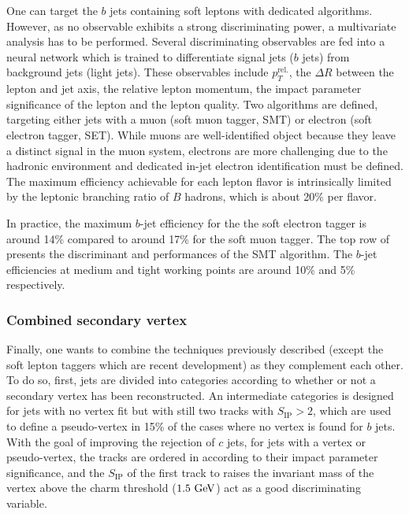    One can target the $b$ jets containing soft leptons with dedicated algorithms. However,
    as no observable exhibits a strong discriminating power, a multivariate analysis
    has to be performed. Several discriminating observables are fed into a neural network
    which is trained to differentiate signal jets ($b$ jets) from background jets (light jets).
    These observables include $p_T^\text{rel.}$, the $\Delta R$ between the lepton and
    jet axis, the relative lepton momentum, the impact parameter significance of the lepton
    and the lepton quality. Two algorithms are defined, targeting either jets with a
    muon (soft muon tagger, SMT) or electron (soft electron tagger, SET). While muons are
    well-identified object because they leave a distinct signal in the muon system,
    electrons are more challenging due to the hadronic environment and dedicated in-jet
    electron identification must be defined. The maximum efficiency achievable for each
    lepton flavor is intrinsically limited by the leptonic branching ratio of $B$ hadrons,
    which is about 20\% per flavor.

    In practice, the maximum $b$-jet efficiency for the the soft electron tagger is around
    14\% compared to around 17\% for the soft muon tagger. The top row of
     presents the discriminant and performances of the
    SMT algorithm. The $b$-jet efficiencies at medium and tight working points are around
    10\% and 5\% respectively.

        \subsubsection{Combined secondary vertex}

    Finally, one wants to combine the techniques previously described (except the
    soft lepton taggers which are recent development) as they complement each other. To
    do so, first, jets are divided into categories according to whether or not a secondary
    vertex has been reconstructed. An intermediate categories is designed for jets
    with no vertex fit but with still two tracks with $S_\text{IP} > 2$, which are used to
    define a pseudo-vertex in 15\% of the cases where no vertex is found for $b$ jets.
    With the goal of improving the rejection of $c$ jets, for jets with a vertex or pseudo-vertex,
    the tracks are ordered in according to their impact parameter significance, and the
    $S_\text{IP}$ of the first track to raises the invariant mass of the vertex above
    the charm threshold ($1.5 ~\text{GeV}$) act as a good discriminating variable.

